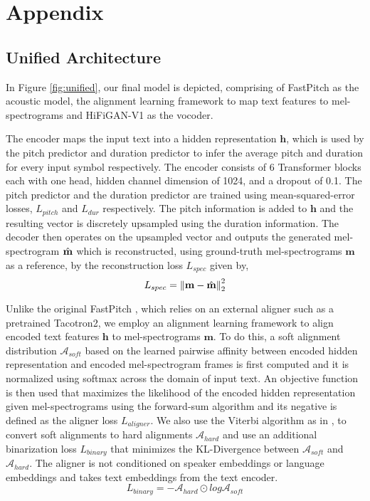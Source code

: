 \documentclass{article}
\begin{document}
\newpage
\appendix
\section{Appendix}
\subsection{Unified Architecture}
\label{appendix:unified}


In Figure \ref{fig:unified}, our final model is depicted, comprising of FastPitch \cite{lancucki2021fastpitch} as the acoustic model, the alignment learning framework \cite{badlani2022one} to map text features to mel-spectrograms and HiFiGAN-V1 \cite{kong2020hifi} as the vocoder.

 The encoder maps the input text into a hidden representation $\mathbf{h}$, which is used by the pitch predictor and duration predictor to infer the average pitch and duration for every input symbol respectively. The encoder consists of 6 Transformer blocks each with one head, hidden channel dimension of 1024, and a dropout of 0.1. The pitch predictor and the duration predictor are trained using mean-squared-error losses, $L_{pitch}$ and $L_{dur}$ respectively. The pitch information is added to $\mathbf{h}$ and the resulting vector is discretely upsampled using the duration information. The decoder then operates on the upsampled vector and outputs the generated mel-spectrogram $\Hat{\mathbf{m}}$ which is reconstructed, using ground-truth mel-spectrograms $\mathbf{m}$ as a reference, by the reconstruction loss $L_{spec}$ given by,
\[
L_{spec} = \left \lVert \mathbf{m} - \Hat{\mathbf{m}} \right \rVert_{2}^{2}
\]

 Unlike the original FastPitch \cite{lancucki2021fastpitch}, which relies on an external aligner such as a pretrained Tacotron2, we employ an alignment learning framework \cite{badlani2022one} to align encoded text features $\mathbf{h}$ to mel-spectrograms $\mathbf{m}$. To do this, a soft alignment distribution $\mathcal{A}_{soft}$
based on the learned pairwise affinity between encoded hidden representation 
and encoded mel-spectrogram frames is first computed and it is normalized using softmax across the domain of input text. An objective function is then used that maximizes the likelihood of the encoded hidden representation given mel-spectrograms using the forward-sum algorithm and its negative is defined as the aligner loss $L_{aligner}$. We also use the Viterbi algorithm as in \cite{badlani2022one}, to convert soft alignments  to hard alignments $\mathcal{A}_{hard}$ and use an additional binarization loss $L_{binary}$ that minimizes the KL-Divergence between $\mathcal{A}_{soft}$ and $\mathcal{A}_{hard}$. The aligner is not conditioned on speaker embeddings or language embeddings and takes text embeddings from the text encoder.
\[
L_{binary} = - \mathcal{A}_{hard} \odot log \mathcal{A}_{soft}
\]
\end{document}
